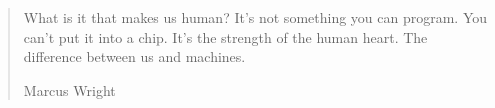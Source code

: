 \begin{quotation} %

What is it that makes us human? It's not something you can
program. You can't put it into a chip. It's the strength of the human
heart. The difference between us and machines.

Marcus Wright

\end{quotation}
